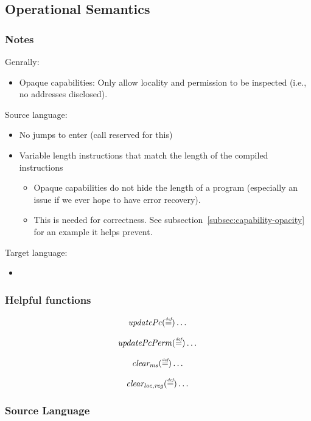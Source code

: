 \documentclass[a4paper]{article}
\newcommand{\defeq}{\stackrel{\textit{\tiny{def}}}{=}}
\newcommand{\plainfun}[2]{
  \ifthenelse{\equal{#2}{}}
  {\mathit{#1}}
  {\mathit{#1}(#2)}
}
\newcommand{\updPcAddr}[1]{\plainfun{updatePc}{#1}}
\newcommand{\updPcPerm}[1]{\plainfun{updatePcPerm}{#1}}
\newcommand{\clearms}[1]{\plainfun{clear_{ms}}{#1}}
\newcommand{\clearlocreg}[1]{\plainfun{clear_{loc,reg}}{#1}}
\begin{document}
\subsection{Operational Semantics}
\subsubsection{Notes}
Genrally:
\begin{itemize}
\item Opaque capabilities: Only allow locality and permission to be inspected (i.e., no addresses disclosed).
\end{itemize}

Source language:
\begin{itemize}
\item No jumps to enter (call reserved for this)
\item Variable length instructions that match the length of the compiled instructions
  \begin{itemize}
  \item Opaque capabilities do not hide the length of a program (especially an issue if we ever hope to have error recovery).
  \item This is needed for correctness. See subsection~\ref{subsec:capability-opacity} for an example it helps prevent.
  \end{itemize}
\end{itemize}

Target language:
\begin{itemize}
\item 
\end{itemize}

\subsubsection{Helpful functions}
\[
  \updPcAddr \defeq \dots
\]

\[
  \updPcPerm \defeq \dots
\]

\[
  \clearms \defeq \dots
\]

\[
  \clearlocreg \defeq \dots
\]

\subsubsection{Source Language}
\end{document}
